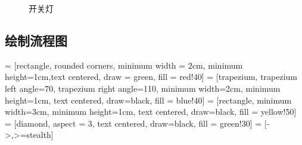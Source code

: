 \documentclass[12pt]{ctexart} %
\begin{document}
\begin{figure}[htbp]
\centering
{}
\caption{开关灯}
\end{figure}

\subsection{绘制流程图}
 = [rectangle, rounded corners, minimum width = 2cm, minimum height=1cm,text centered, draw = green, fill = red!40]
 = [trapezium, trapezium left angle=70, trapezium right angle=110, minimum width=2cm, minimum height=1cm, text centered, draw=black, fill = blue!40]
 = [rectangle, minimum width=3cm, minimum height=1cm, text centered, draw=black, fill = yellow!50]
 = [diamond, aspect = 3, text centered, draw=black, fill = green!30]
 = [->,>=stealth]
\end{document}
